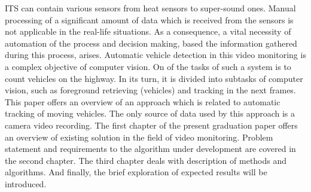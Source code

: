 \documentclass[12pt,a4paper,oneside,titlepage]{article}
\begin{document}
ITS can contain various sensors from heat sensors to super-sound ones.
Manual processing of a significant amount of data which is received from the sensors is not applicable in the real-life situations.
As a consequence, a vital necessity of automation of the process and decision making, based the information gathered during this process, arises.
Automatic vehicle detection in this video monitoring is a complex objective of computer vision.
On of the tasks of such a system is to count vehicles on the highway.
In its turn, it is divided into subtasks of computer vision, such as foreground retrieving (vehicles) and tracking in the next frames.
This paper offers an overview of an approach which is related to automatic tracking of moving vehicles.
The only source of data used by this approach is a camera video recording.
The first chapter of the present graduation paper offers an overview of existing solution in the field of video monitoring.
Problem statement and requirements to the algorithm under development are covered in the second chapter.
The third chapter deals with description of methods and algorithms.
And finally, the brief exploration of expected results will be introduced.
\end{document}
